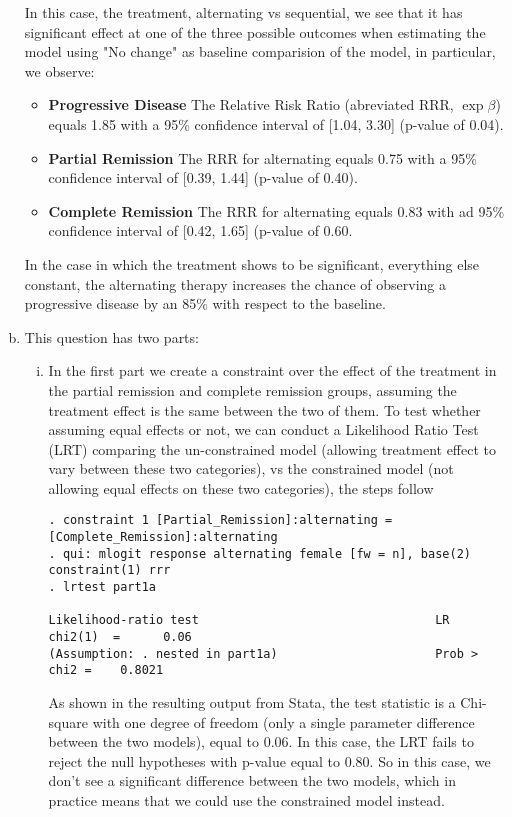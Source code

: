 \documentclass{article}
\begin{document}
\begin{enumerate}[a.]
In this case, the treatment, alternating vs sequential, we see that it has significant effect at one of the three possible outcomes when estimating the model using "No change" as baseline comparision of the model, in particular, we observe:

\begin{itemize}
	\item \textbf{Progressive Disease} The Relative Risk Ratio (abreviated RRR, $\exp{\beta}$) equals 1.85 with a 95\% confidence interval of [1.04, 3.30] (p-value of 0.04).
	\item \textbf{Partial Remission} The RRR for alternating equals 0.75 with a 95\% confidence interval of [0.39, 1.44] (p-value of 0.40).
	\item \textbf{Complete Remission} The RRR for alternating equals 0.83 with ad 95\% confidence interval of [0.42, 1.65] (p-value of 0.60.
\end{itemize}

In the case in which the treatment shows to be significant, everything else constant, the alternating therapy increases the chance of observing a progressive disease by an 85\% with respect to the baseline.

\item This question has two parts:

\begin{enumerate}[i.]
	\item In the first part we create a constraint over the effect of the treatment in the partial remission and complete remission groups, assuming the treatment effect is the same between the two of them. To test whether assuming equal effects or not, we can conduct a Likelihood Ratio Test (LRT) comparing the un-constrained model (allowing treatment effect to vary between these two categories), vs the constrained model (not allowing equal effects on these two categories), the steps follow
\begin{verbatim}
. constraint 1 [Partial_Remission]:alternating = [Complete_Remission]:alternating
. qui: mlogit response alternating female [fw = n], base(2) constraint(1) rrr
. lrtest part1a

Likelihood-ratio test                                 LR chi2(1)  =      0.06
(Assumption: . nested in part1a)                      Prob > chi2 =    0.8021
\end{verbatim}
	
	As shown in the resulting output from Stata, the test statistic is a Chi-square with one degree of freedom (only a single parameter difference between the two models), equal to 0.06. In this case, the LRT fails to reject the null hypotheses with p-value equal to 0.80. So in this case, we don't see a significant difference between the two models, which in practice means that we could use the constrained model instead.
	

\end{enumerate}
\end{enumerate}
\end{document}
